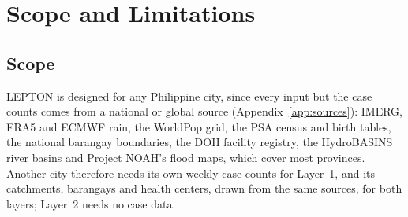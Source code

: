 \section{Scope and Limitations}\label{sec:scope}

\subsection{Scope}\label{sec:scope-scope}

LEPTON is designed for any Philippine city, since every input but the case counts comes from a
national or global source (Appendix~\ref{app:sources}): IMERG, ERA5 and ECMWF rain, the WorldPop
grid, the PSA census and birth tables, the national barangay boundaries, the DOH facility
registry, the HydroBASINS river basins and Project NOAH's flood maps, which cover most provinces.
Another city therefore needs its own weekly case counts for Layer~1, and its catchments,
barangays and health centers, drawn from the same sources, for both layers; Layer~2 needs no
case data.


